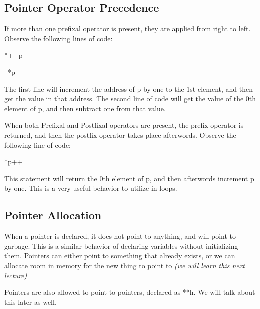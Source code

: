 \documentclass[letterpaper]{article}
\theoremstyle{remark}
\begin{document}
\subsection{Pointer Operator Precedence}
If more than one prefixal operator is present, they are applied from right to left. Observe the following lines of code:

*++p

--*p

The first line will increment the address of p by one to the 1st element, and then get the value in that address. The second line of code will get the value of the 0th element of p, and then subtract one from that value.

When both Prefixal and Postfixal operators are present, the prefix operator is returned, and then the postfix operator takes place afterwords. Observe the following line of code:

*p++

This statement will return the 0th element of p, and then afterwords increment p by one. This is a very useful behavior to utilize in loops.

\subsection{Pointer Allocation}
When a pointer is declared, it does not point to anything, and will point to garbage. This is a similar behavior of declaring variables without initializing them. Pointers can either point to something that already exists, or we can allocate room in memory for the new thing to point to \textit{(we will learn this next lecture)}

Pointers are also allowed to point to pointers, declared as **h. We will talk about this later as well.
\end{document}
